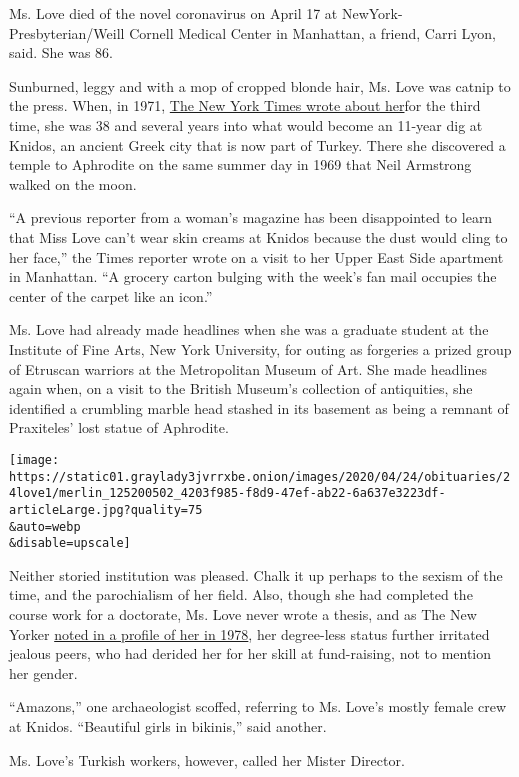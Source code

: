 Ms. Love died of the novel coronavirus on April 17 at
NewYork-Presbyterian/Weill Cornell Medical Center in Manhattan, a
friend, Carri Lyon, said. She was 86.

Sunburned, leggy and with a mop of cropped blonde hair, Ms. Love was
catnip to the press. When, in 1971,
\href{https://www.nytimes3xbfgragh.onion/1971/03/07/archives/an-archeological-find-named-iris-love-archeological-find.html}{The
New York Times wrote about her}for the third time, she was 38 and
several years into what would become an 11-year dig at Knidos, an
ancient Greek city that is now part of Turkey. There she discovered a
temple to Aphrodite on the same summer day in 1969 that Neil Armstrong
walked on the moon.

``A previous reporter from a woman's magazine has been disappointed to
learn that Miss Love can't wear skin creams at Knidos because the dust
would cling to her face,'' the Times reporter wrote on a visit to her
Upper East Side apartment in Manhattan. ``A grocery carton bulging with
the week's fan mail occupies the center of the carpet like an icon.''

Ms. Love had already made headlines when she was a graduate student at
the Institute of Fine Arts, New York University, for outing as forgeries
a prized group of Etruscan warriors at the Metropolitan Museum of Art.
She made headlines again when, on a visit to the British Museum's
collection of antiquities, she identified a crumbling marble head
stashed in its basement as being a remnant of Praxiteles' lost statue of
Aphrodite.

\texttt{[image: https://static01.graylady3jvrrxbe.onion/images/2020/04/24/obituaries/24love1/merlin\_125200502\_4203f985-f8d9-47ef-ab22-6a637e3223df-articleLarge.jpg?quality=75\\\&auto=webp\\\&disable=upscale]}

Neither storied institution was pleased. Chalk it up perhaps to the
sexism of the time, and the parochialism of her field. Also, though she
had completed the course work for a doctorate, Ms. Love never wrote a
thesis, and as The New Yorker
\href{https://www.newyorker.com/magazine/1978/07/17/the-dig-at-cnidus}{noted
in a profile of her in 1978}, her degree-less status further irritated
jealous peers, who had derided her for her skill at fund-raising, not to
mention her gender.

``Amazons,'' one archaeologist scoffed, referring to Ms. Love's mostly
female crew at Knidos. ``Beautiful girls in bikinis,'' said another.

Ms. Love's Turkish workers, however, called her Mister Director.

